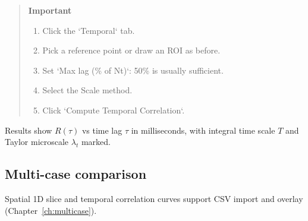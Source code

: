 \begin{quote}
\textbf{Important}
\begin{enumerate}[leftmargin=1.5em, topsep=2pt]
  \item Click the `Temporal` tab.
  \item Pick a reference point or draw an ROI as before.
  \item Set `Max lag (\% of Nt)`: 50\% is usually sufficient.
  \item Select the Scale method.
  \item Click `Compute Temporal Correlation`.
\end{enumerate}
\end{quote}

Results show $R(\tau)$ vs time lag $\tau$ in milliseconds, with integral time scale $T$ and Taylor microscale $\lambda_t$ marked.

\subsection{Multi-case comparison}

Spatial 1D slice and temporal correlation curves support CSV import and overlay (Chapter~\ref{ch:multicase}).

